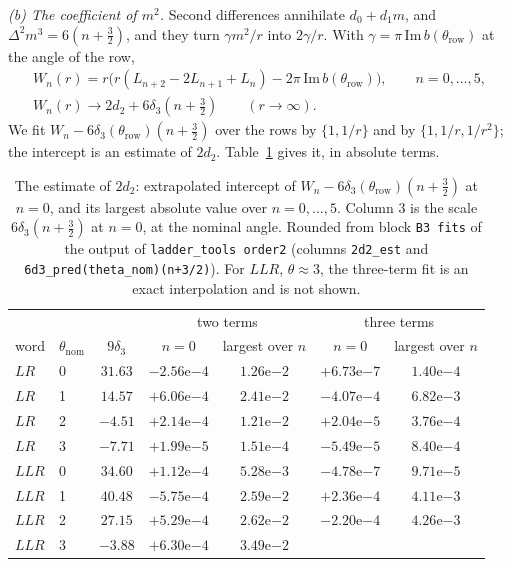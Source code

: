 \documentclass[11pt]{amsart}
\theoremstyle{definition}
\theoremstyle{remark}
\begin{document}
\emph{(b) The coefficient of $m^2$.} Second differences annihilate $d_0 + d_1m$, and
$\Delta^2 m^3 = 6(n + \frac32)$, and they turn $\gamma m^2/r$ into $2\gamma/r$. With
$\gamma = \pi\,\mathrm{Im}\,b(\theta_{\mathrm{row}})$ at the angle of the row,
\begin{gather*}
W_n(r) = r\big(r(L_{n+2} - 2L_{n+1} + L_n) - 2\pi\,\mathrm{Im}\,b(\theta_{\mathrm{row}})\big),
\qquad n = 0, \dots, 5,\\
W_n(r) \to 2d_2 + 6\delta_3\left(n + \tfrac32\right) \qquad (r \to \infty).
\end{gather*}
We fit $W_n - 6\delta_3(\theta_{\mathrm{row}})(n + \frac32)$ over the rows by
$\{1, 1/r\}$ and by $\{1, 1/r, 1/r^2\}$; the intercept is an estimate of $2d_2$.
Table~\ref{tab:order2b} gives it, in absolute terms.

\begin{table}[ht]
\centering
\small
\setlength{\tabcolsep}{4pt}
\begin{tabular}{llccccc}
\toprule
& & & \multicolumn{2}{c}{two terms} & \multicolumn{2}{c}{three terms} \\
word & $\theta_{\mathrm{nom}}$ & $9\delta_3$ & $n = 0$ & largest over $n$ & $n = 0$ & largest over $n$ \\
\midrule
$LR$  & 0 & $31.63$ & $-2.56\mathrm{e}{-4}$ & $1.26\mathrm{e}{-2}$ & $+6.73\mathrm{e}{-7}$ & $1.40\mathrm{e}{-4}$ \\
$LR$  & 1 & $14.57$ & $+6.06\mathrm{e}{-4}$ & $2.41\mathrm{e}{-2}$ & $-4.07\mathrm{e}{-4}$ & $6.82\mathrm{e}{-3}$ \\
$LR$  & 2 & $-4.51$ & $+2.14\mathrm{e}{-4}$ & $1.21\mathrm{e}{-2}$ & $+2.04\mathrm{e}{-5}$ & $3.76\mathrm{e}{-4}$ \\
$LR$  & 3 & $-7.71$ & $+1.99\mathrm{e}{-5}$ & $1.51\mathrm{e}{-4}$ & $-5.49\mathrm{e}{-5}$ & $8.40\mathrm{e}{-4}$ \\
$LLR$ & 0 & $34.60$ & $+1.12\mathrm{e}{-4}$ & $5.28\mathrm{e}{-3}$ & $-4.78\mathrm{e}{-7}$ & $9.71\mathrm{e}{-5}$ \\
$LLR$ & 1 & $40.48$ & $-5.75\mathrm{e}{-4}$ & $2.59\mathrm{e}{-2}$ & $+2.36\mathrm{e}{-4}$ & $4.11\mathrm{e}{-3}$ \\
$LLR$ & 2 & $27.15$ & $+5.29\mathrm{e}{-4}$ & $2.62\mathrm{e}{-2}$ & $-2.20\mathrm{e}{-4}$ & $4.26\mathrm{e}{-3}$ \\
$LLR$ & 3 & $-3.88$ & $+6.30\mathrm{e}{-4}$ & $3.49\mathrm{e}{-2}$ & & \\
\bottomrule
\end{tabular}
\caption{The estimate of $2d_2$: extrapolated intercept of
$W_n - 6\delta_3(\theta_{\mathrm{row}})(n+\frac32)$ at $n = 0$, and its largest absolute
value over $n = 0, \dots, 5$. Column 3 is the scale $6\delta_3(n + \frac32)$ at $n = 0$,
at the nominal angle. Rounded from block \texttt{B3 fits} of the output of
\texttt{ladder\_tools order2} (columns \texttt{2d2\_est} and
\texttt{6d3\_pred(theta\_nom)(n+3/2)}). For $LLR$, $\theta \approx 3$, the three-term fit
is an exact interpolation and is not shown.}
\label{tab:order2b}
\end{table}
\end{document}

